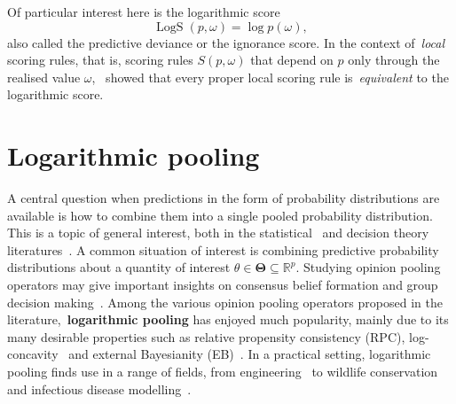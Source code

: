 \documentclass[a4paper, notitlepage, 11pt]{article}
\begin{document}

Of particular interest here is the logarithmic score
\begin{equation}
\label{eq:logScore}
 \operatorname{LogS}(p, \omega) = \log p(\omega),
\end{equation}
also called the predictive deviance or the ignorance score.
In the context of~\textit{local} scoring rules, that is, scoring rules $S(p, \omega)$ that depend on $p$ only through the realised value $\omega$,~\cite{Bernardo1979} showed that  every  proper  local scoring rule is~\textit{equivalent} to the logarithmic score.%

\section{Logarithmic pooling}
\label{sec:background}

A central question when predictions in the form of probability distributions are available is how to combine them into a single pooled probability distribution.
This is a topic of general interest, both in the statistical~\citep{West1984, Genest1986A, Genest1986B} and decision theory literatures~\citep{Genest1984,French1985,Guardoni2002}.
A common situation of interest is combining predictive probability distributions about a quantity of interest $\theta \in \mathbf{\Theta} \subseteq \mathbb{R}^p$.
Studying opinion pooling operators may give important insights on consensus belief formation and group decision making~\citep{West1984,Genest1986B,Guardoni2002}.
Among the various opinion pooling operators proposed in the literature,~\textbf{logarithmic pooling} has enjoyed much popularity, mainly due to its many desirable properties such as relative propensity consistency (RPC), log-concavity~\citep{Carvalho2019} and external Bayesianity (EB)~\citep{Genest1986A}. 
In a practical setting, logarithmic pooling finds use in a range of fields, from engineering~\citep{Lind1988, Savchuk1994} to wildlife conservation~\citep{Poole2000} and infectious disease modelling~\citep{Coelho2009}.
\end{document}
